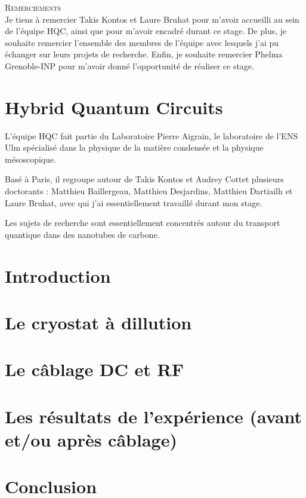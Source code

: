 \documentclass[a4paper,11pt]{report}
\date{}
\title{}
\author{}
\begin{document}
\nocite{*}


\begin{center}
\textsc{\Large Remerciements}
\\
\vspace{0.5cm}
Je tiens à remercier Takis Kontos et Laure Bruhat pour m'avoir accueilli au sein de l'équipe HQC, ainsi que pour m'avoir encadré durant ce stage. De plus, je souhaite remercier l'ensemble des membres de l'équipe avec lesquels j'ai pu échanger sur leurs projets de recherche. Enfin, je souhaite remercier Phelma Grenoble-INP pour m'avoir donné l'opportunité de réaliser ce stage.
\end{center}

\chapter*{Hybrid Quantum Circuits}
L'équipe HQC fait partie du Laboratoire Pierre Aigrain, le laboratoire de l'ENS Ulm spécialisé dans la physique de la matière condensée et la physique mésoscopique.

Basé à Paris, il regroupe autour de Takis Kontos et Audrey Cottet plusieurs doctorants : Matthieu Baillergeau, Matthieu Desjardins, Matthieu Dartiailh et Laure Bruhat, avec qui j'ai essentiellement travaillé durant mon stage.

Les sujets de recherche sont essentiellement concentrés autour du transport quantique dans des nanotubes de carbone.

\chapter*{Introduction} %

\chapter{Le cryostat à dillution}

\chapter{Le câblage DC et RF}

\chapter{Les résultats de l'expérience (avant et/ou après câblage)}


\chapter*{Conclusion}
%



\end{document}
